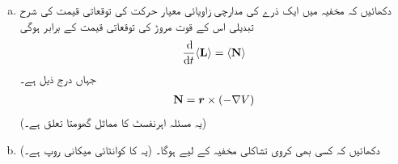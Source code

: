 \begin{enumerate}[a.]
\item
دکھائیں کہ مخفیہ  میں ایک ذرے کی مدارچی زاویائی معیار حرکت  کی توقعاتی قیمت کی شرح تبدیلی اس کے قوت مروڑ کی توقعاتی قیمت کے برابر ہوگی 
\begin{align*}
\frac{\dif}{\dif t} \langle \mat{L} \rangle = \langle \mat{N} \rangle
\end{align*}
جہاں درج ذیل ہے۔
\begin{align*}
\operatorname{\mathbf{N}} = {{\boldsymbol{r}}} \times (- \nabla V)
\end{align*}
(یہ مسئلہ اہرنفسٹ کا مماثل گھومتا تعلق ہے۔)
\item
دکھائیں کہ کسی بھی کروی تشاکلی مخفیہ کے لیے  ہوگا۔ (یہ  کا کوانٹائی میکانی روپ ہے۔) 
\end{enumerate}


